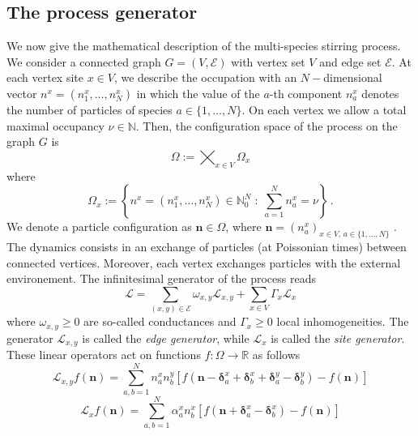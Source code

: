 \documentclass[10pt]{article}
\numberwithin{equation}{section}
\numberwithin{equation}{subsection}
\newcommand{\twoj}{\nu}
\begin{document}
\subsection{The process generator}\label{subsectionGeneratorStr}
We now give the mathematical description of the multi-species stirring process.
We consider a connected graph $G=(V,\mathcal{E})$ with vertex set $V$ and edge set $\mathcal{E}$.
At each vertex site $x\in V$, we describe the occupation with an $N-$dimensional vector $n^{x}=(n_{1}^{x},\ldots,n_{N}^{x})$ in which the value of the $a$-th component $n_{a}^{x}$ denotes the number of particles of species $a\in \{1,\ldots,N\}$. On each vertex we allow a total  maximal occupancy $\nu\in \mathbb{N}$. Then, the configuration space of the process on the graph $G$ is 
\begin{equation}\label{stateSpace}
    \Omega:=\bigtimes_{x\in V} \Omega_{x}
\end{equation}
where
\begin{equation}
\Omega_{x}:=\left\{n^x=(n_{1}^{x},\ldots,n_{N}^{x})\in\mathbb{N}_0^{N}\;:\; \sum_{a=1}^{N}n_{a}^{x}=\twoj\right\}\,.
\end{equation}
We denote a particle configuration as $\bm{n}\in \Omega$, where $\bm{n}=(n_{a}^{x})_{x\in V,\,a\in\{1,\ldots,N\}}$ .\\
The dynamics consists in an exchange of particles (at Poissonian times) between connected vertices. Moreover, each vertex  exchanges particles with the external environement. The infinitesimal generator of the process reads
\begin{equation}\label{Generator}
    \mathcal{L}=\sum_{(x,y)\in \mathcal{E}}\omega_{x,y}\mathcal{L}_{x,y}+\sum_{x\in V}\Gamma_{x}\mathcal{L}_{x}
\end{equation}
where  $ \omega_{x,y}\geq 0$ are so-called conductances and $\Gamma_{x}\geq 0$ local inhomogeneities. The generator $\mathcal{L}_{x,y}$ is called the \textit{edge generator}, while $\mathcal{L}_{x}$ is called the \textit{site generator}. These linear operators act on functions $f:\Omega\to \mathbb{R}$ as follows
\begin{equation}\label{edgeGenerator}
\mathcal{L}_{x,y}f(\bm{n})=\sum_{a,b=1}^{N}n_{a}^{x}n_{b}^{y}\left[f(\bm{n}-\bm{\delta}^{x}_{a}+\bm{\delta}_{b}^{x}+\bm{\delta}_{a}^{y}-\bm{\delta}_{b}^{y})-f(\bm{n})\right]
\end{equation}
\begin{equation}\label{siteGenerator}
    \mathcal{L}_{x}f(\bm{n})=\sum_{a,b=1}^{N}\alpha_{a}^{x}n_{b}^{x}\left[f(\bm{n}+\bm{\delta}_{a}^{x}-\bm{\delta}_{b}^{x})-f(\bm{n})\right]
\end{equation}
\end{document}
